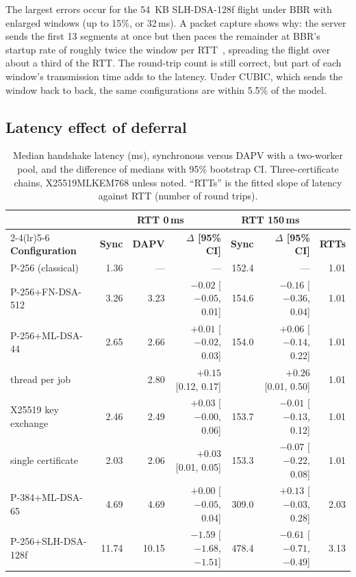 \documentclass[preprint,10pt,3p]{elsarticle}
\newcommand{\ms}{\,ms}
\begin{document}
The largest errors occur for the 54~KB SLH-DSA-128f flight under BBR with
enlarged windows (up to 15\%, or 32\ms).  A packet capture shows why: the
server sends the first 13 segments at once but then paces the remainder at
BBR's startup rate of roughly twice the window per RTT~\cite{Cardwell2016BBR},
spreading the flight over about a third of the RTT.  The round-trip count is
still correct, but part of each window's transmission time adds to the
latency.  Under CUBIC, which sends the window back to back, the same
configurations are within 5.5\% of the model.

\subsection{Latency effect of deferral}
\label{sec:res_latency}

\begin{table}[t]
\centering
\caption{Median handshake latency (ms), synchronous versus DAPV with a
  two-worker pool, and the difference of medians with 95\% bootstrap CI.
  Three-certificate chains, X25519MLKEM768 unless noted.  ``RTTs'' is the
  fitted slope of latency against RTT (number of round trips).}
\label{tab:e1}
\small
\setlength{\tabcolsep}{4pt}
\begin{tabular}{lrrrrrr}
\toprule
& \multicolumn{3}{c}{\textbf{RTT 0\ms}} & \multicolumn{2}{c}{\textbf{RTT 150\ms}} & \\
\cmidrule(lr){2-4}\cmidrule(lr){5-6}
\textbf{Configuration} & \textbf{Sync} & \textbf{DAPV} & \textbf{$\Delta$ [95\% CI]}
  & \textbf{Sync} & \textbf{$\Delta$ [95\% CI]} & \textbf{RTTs} \\
\midrule
P-256 (classical)          & 1.36  & ---   & ---                      & 152.4 & ---                    & 1.01 \\
P-256+FN-DSA-512           & 3.26  & 3.23  & $-0.02$ [$-0.05$, 0.01]  & 154.6 & $-0.16$ [$-0.36$, 0.04] & 1.01 \\
P-256+ML-DSA-44            & 2.65  & 2.66  & $+0.01$ [$-0.02$, 0.03]  & 154.0 & $+0.06$ [$-0.14$, 0.22] & 1.01 \\
\quad thread per job       &       & 2.80  & $+0.15$ [0.12, 0.17]     &       & $+0.26$ [0.01, 0.50]    & 1.01 \\
\quad X25519 key exchange  & 2.46  & 2.49  & $+0.03$ [$-0.00$, 0.06]  & 153.7 & $-0.01$ [$-0.13$, 0.12] & 1.01 \\
\quad single certificate   & 2.03  & 2.06  & $+0.03$ [0.01, 0.05]     & 153.3 & $-0.07$ [$-0.22$, 0.08] & 1.01 \\
P-384+ML-DSA-65            & 4.69  & 4.69  & $+0.00$ [$-0.05$, 0.04]  & 309.0 & $+0.13$ [$-0.03$, 0.28] & 2.03 \\
P-256+SLH-DSA-128f         & 11.74 & 10.15 & $-1.59$ [$-1.68$, $-1.51$] & 478.4 & $-0.61$ [$-0.71$, $-0.49$] & 3.13 \\
\bottomrule
\end{tabular}
\end{table}
\end{document}
